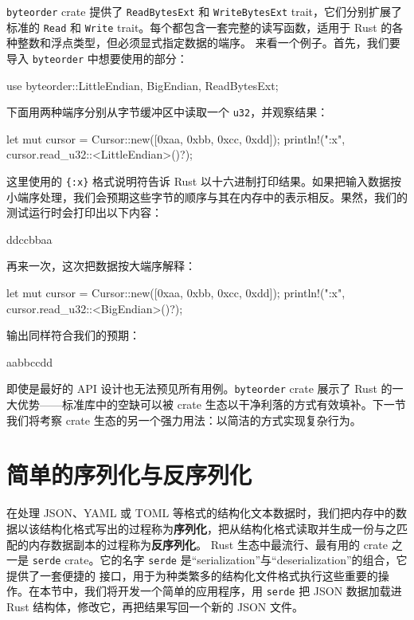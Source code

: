 \label{idx:idx_583bd734}
\texttt{byteorder} crate 提供了 \texttt{ReadBytesExt} 和 \texttt{WriteBytesExt} trait，它们分别扩展了标准的 \texttt{Read} 和 \texttt{Write} trait。每个都包含一套完整的读写函数，适用于 Rust 的各种整数和浮点类型，但必须显式指定数据的端序。
来看一个例子。首先，我们要导入 \texttt{byteorder} 中想要使用的部分：
\begin{codebox}[rust]
use byteorder::{LittleEndian, BigEndian, ReadBytesExt};
\end{codebox}
下面用两种端序分别从字节缓冲区中读取一个 \texttt{u32}，并观察结果：
\begin{codebox}[rust]
let mut cursor = Cursor::new([0xaa, 0xbb, 0xcc, 0xdd]);
println!("{:x}", cursor.read_u32::<LittleEndian>()?);
\end{codebox}
这里使用的 \texttt{\{:x\}} 格式说明符告诉 Rust 以十六进制打印结果。如果把输入数据按小端序处理，我们会预期这些字节的顺序与其在内存中的表示相反。果然，我们的测试运行时会打印出以下内容：
\begin{codeboxdark}
ddccbbaa
\end{codeboxdark}
再来一次，这次把数据按大端序解释：
\begin{codebox}[rust]
let mut cursor = Cursor::new([0xaa, 0xbb, 0xcc, 0xdd]);
println!("{:x}", cursor.read_u32::<BigEndian>()?);
\end{codebox}
输出同样符合我们的预期：
\begin{codeboxdark}
aabbccdd
\end{codeboxdark}
\label{idx:idx_344e6643}
即使是最好的 API 设计也无法预见所有用例。\texttt{byteorder} crate 展示了 Rust 的一大优势——标准库中的空缺可以被 crate 生态以干净利落的方式有效填补。下一节我们将考察 crate 生态的另一个强力用法：以简洁的方式实现复杂行为。
\section{简单的序列化与反序列化}
\label{idx:idx_086a04f7}
\label{idx:idx_fd49d109}
在处理 JSON、YAML 或 TOML 等格式的结构化文本数据时，我们把内存中的数据以该结构化格式写出的过程称为\textbf{序列化}，把从结构化格式读取并生成一份与之匹配的内存数据副本的过程称为\textbf{反序列化}。
Rust 生态中最流行、最有用的 crate 之一是 \texttt{serde} crate。它的名字
\texttt{serde} 是“serialization”与“deserialization”的组合，它提供了一套便捷的
接口，用于为种类繁多的结构化文件格式执行这些重要的操作。在本节中，我们将开发一个简单的应用程序，用 \texttt{serde} 把 JSON 数据加载进 Rust 结构体，修改它，再把结果写回一个新的 JSON 文件。
